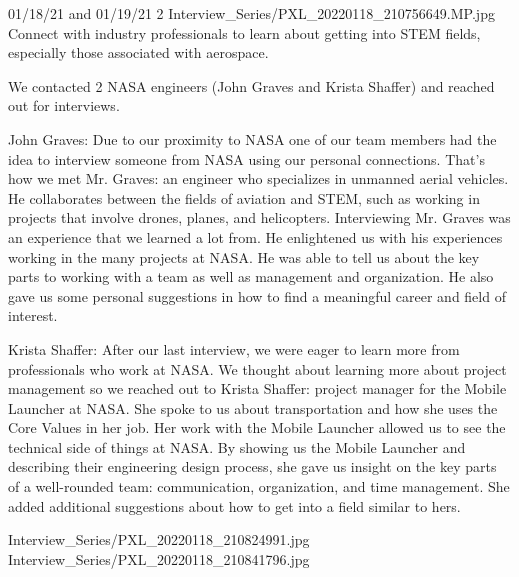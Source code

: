 {01/18/21 and 01/19/21}
{2}
{Interview_Series/PXL_20220118_210756649.MP.jpg}
{Connect with industry professionals to learn about getting into STEM fields, especially those associated with aerospace.} 
{
We contacted 2 NASA engineers (John Graves and Krista Shaffer) and reached out for interviews. 

John Graves:
Due to our proximity to NASA one of our team members had the idea to interview someone from NASA using our personal connections. That’s how we met Mr. Graves: an engineer who specializes in unmanned aerial vehicles. He collaborates between the fields of aviation and STEM, such as working in projects that involve drones, planes, and helicopters. Interviewing Mr. Graves was an experience that we learned a lot from. He enlightened us with his experiences working in the many projects at NASA. He was able to tell us about the key parts to working with a team as well as management and organization. He also gave us some personal suggestions in how to find a meaningful career and field of interest. 

Krista Shaffer:
After our last interview, we were eager to learn more from professionals who work at NASA. We thought about learning more about project management so we reached out to Krista Shaffer: project manager for the Mobile Launcher at NASA. She spoke to us about transportation and how she uses the Core Values in her job. Her work with the Mobile Launcher allowed us to see the technical side of things at NASA. By showing us the Mobile Launcher and describing their engineering design process, she gave us insight on the key parts of a well-rounded team: communication, organization, and time management. She added additional suggestions about how to get into a field similar to hers. 

} 
{Interview_Series/PXL_20220118_210824991.jpg}
{Interview_Series/PXL_20220118_210841796.jpg}
